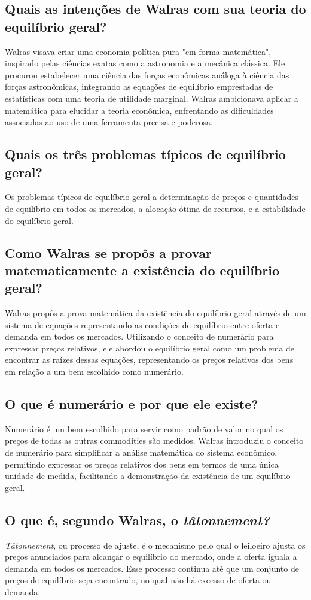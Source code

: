 \documentclass[12pt]{article}
\begin{document}
\subsection{\textbf{Quais as intenções de Walras com sua teoria do equilíbrio geral?}}
Walras visava criar uma economia política pura "em forma matemática", inspirado pelas ciências exatas como a astronomia e a mecânica clássica. Ele procurou estabelecer uma ciência das forças econômicas análoga à ciência das forças astronômicas, integrando as equações de equilíbrio emprestadas de estatísticas com uma teoria de utilidade marginal. Walras ambicionava aplicar a matemática para elucidar a teoria econômica, enfrentando as dificuldades associadas ao uso de uma ferramenta precisa e poderosa.
\subsection{\textbf{Quais os três problemas típicos de equilíbrio geral?}}
Os problemas típicos de equilíbrio geral a determinação de preços e quantidades de equilíbrio em todos os mercados, a alocação ótima de recursos, e a estabilidade do equilíbrio geral.
\subsection{\textbf{Como Walras se propôs a provar matematicamente a existência do equilíbrio geral?}}
Walras propôs a prova matemática da existência do equilíbrio geral através de um sistema de equações representando as condições de equilíbrio entre oferta e demanda em todos os mercados. Utilizando o conceito de numerário para expressar preços relativos, ele abordou o equilíbrio geral como um problema de encontrar as raízes dessas equações, representando os preços relativos dos bens em relação a um bem escolhido como numerário.
\subsection{\textbf{O que é numerário e por que ele existe?}}
Numerário é um bem escolhido para servir como padrão de valor no qual os preços de todas as outras commodities são medidos. Walras introduziu o conceito de numerário para simplificar a análise matemática do sistema econômico, permitindo expressar os preços relativos dos bens em termos de uma única unidade de medida, facilitando a demonstração da existência de um equilíbrio geral.
\subsection{\textbf{O que é, segundo Walras, o \textit{tâtonnement?}}}
\textit{Tâtonnement}, ou processo de ajuste, é o mecanismo pelo qual o leiloeiro ajusta os preços anunciados para alcançar o equilíbrio do mercado, onde a oferta iguala a demanda em todos os mercados. Esse processo continua até que um conjunto de preços de equilíbrio seja encontrado, no qual não há excesso de oferta ou demanda.
\end{document}
